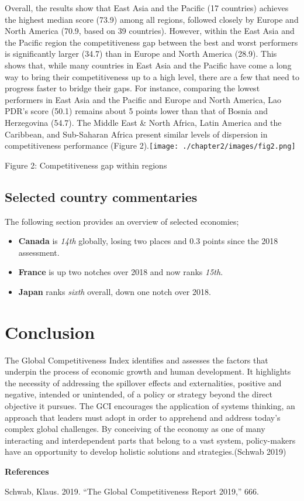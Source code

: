 \documentclass[
]{article}
\providecommand{\tightlist}{%
  \setlength{\itemsep}{0pt}\setlength{\parskip}{0pt}}
\newlength{\cslhangindent}
\newlength{\cslentryspacingunit} %
\newenvironment{CSLReferences}[2] %
 {%
  \setlength{\parindent}{0pt}
  \ifodd #1
  \let\oldpar\par
  \def\par{\hangindent=\cslhangindent\oldpar}
  \fi
  \setlength{\parskip}{#2\cslentryspacingunit}
 }%
 {}
\begin{document}
Overall, the results show that East Asia and the Pacific (17 countries)
achieves the highest median score (73.9) among all regions, followed
closely by Europe and North America (70.9, based on 39 countries).
However, within the East Asia and the Pacific region the competitiveness
gap between the best and worst performers is significantly larger (34.7)
than in Europe and North America (28.9). This shows that, while many
countries in East Asia and the Pacific have come a long way to bring
their competitiveness up to a high level, there are a few that need to
progress faster to bridge their gaps. For instance, comparing the lowest
performers in East Asia and the Pacific and Europe and North America,
Lao PDR's score (50.1) remains about 5 points lower than that of Bosnia
and Herzegovina (54.7). The Middle East \& North Africa, Latin America
and the Caribbean, and Sub-Saharan Africa present similar levels of
dispersion in competitiveness performance (Figure
2).\texttt{[image: ./chapter2/images/fig2.png]}

Figure 2: Competitiveness gap within regions

\hypertarget{selected-country-commentaries}{%
\subsection{Selected country
commentaries}\label{selected-country-commentaries}}

The following section provides an overview of selected economies;

\begin{itemize}
\tightlist
\item
  \textbf{Canada} is \emph{14th} globally, losing two places and 0.3
  points since the 2018 assessment.\\
\item
  \textbf{France} is up two notches over 2018 and now ranks
  \emph{15th}.\\
\item
  \textbf{Japan} ranks \emph{sixth} overall, down one notch over 2018.
\end{itemize}

\hypertarget{conclusion}{%
\section{Conclusion}\label{conclusion}}

The Global Competitiveness Index identifies and assesses the factors
that underpin the process of economic growth and human development. It
highlights the necessity of addressing the spillover effects and
externalities, positive and negative, intended or unintended, of a
policy or strategy beyond the direct objective it pursues. The GCI
encourages the application of systems thinking, an approach that leaders
must adopt in order to apprehend and address today's complex global
challenges. By conceiving of the economy as one of many interacting and
interdependent parts that belong to a vast system, policy-makers have an
opportunity to develop holistic solutions and strategies.(Schwab 2019)

\textbf{References}

\hypertarget{refs}{}
\begin{CSLReferences}{1}{0}
\leavevmode{}%
Schwab, Klaus. 2019. {``The {Global} {Competitiveness} {Report} 2019,''}
666.

\end{CSLReferences}
\end{document}
